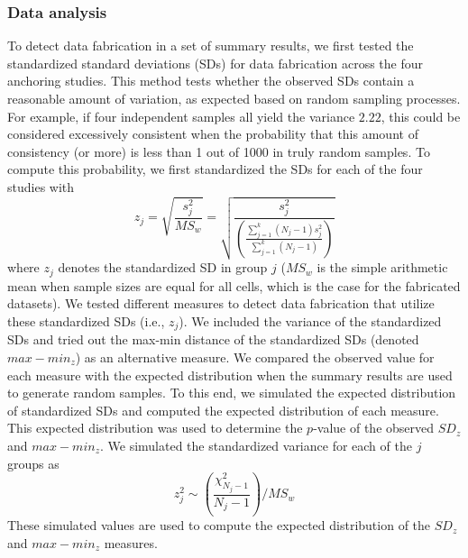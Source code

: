 \documentclass{article}
\begin{document}
\subsubsection*{Data analysis}

To detect data fabrication in a set of summary results, we first tested the standardized standard deviations (SDs) for data fabrication \citep{simonsohn2013} across the four anchoring studies. This method tests whether the observed SDs contain a reasonable amount of variation, as expected based on random sampling processes. For example, if four independent samples all yield the variance $2.22$, this could be considered excessively consistent when the probability that this amount of consistency (or more) is less than 1 out of 1000 in truly random samples. To compute this probability, we first standardized the SDs for each of the four studies with
\begin{equation}
z_j=\sqrt{\frac{s^2_j}{MS_w}}=\sqrt{\frac{s^2_j}{\left(\frac{\sum\limits^k_{j=1}(N_j-1)s^2_j}{\sum\limits^k_{j=1}(N_j-1)}\right)}}
\label{s2_j}
\end{equation}
where $z_j$ denotes the standardized SD in group $j$ ($MS_w$ is the simple arithmetic mean when sample sizes are equal for all cells, which is the case for the fabricated datasets). We tested different measures to detect data fabrication that utilize these standardized SDs (i.e., $z_j$). We included the variance of the standardized SDs \citep[i.e.,  $SD_{z}$;][]{simonsohn2013} and tried out the max-min distance of the standardized SDs (denoted $max-min_{z}$) as an alternative measure. We compared the observed value for each measure with the expected distribution when the summary results are used to generate random samples. To this end, we simulated the expected distribution of standardized SDs and computed the expected distribution of each measure. This expected distribution was used to determine the $p$-value of the observed $SD_z$ and $max-min_z$. We simulated the standardized variance for each of the $j$ groups as
\begin{equation}
z^2_j\sim\left(\frac{\chi^2_{N_j-1}}{N_j-1}\right)/MS_w
\label{simvar}
\end{equation}
These simulated values are used to compute the expected distribution of the $SD_z$ and $max-min_z$  measures.
\end{document}
